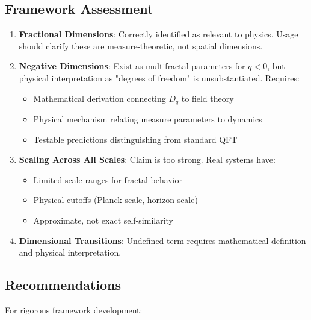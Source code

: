 \subsection{Framework Assessment}

\begin{enumerate}
    \item \textbf{Fractional Dimensions}: Correctly identified as relevant to physics. Usage should clarify these are measure-theoretic, not spatial dimensions.

    \item \textbf{Negative Dimensions}: Exist as multifractal parameters for $q < 0$, but physical interpretation as "degrees of freedom" is unsubstantiated. Requires:
    \begin{itemize}
        \item Mathematical derivation connecting $D_q$ to field theory
        \item Physical mechanism relating measure parameters to dynamics
        \item Testable predictions distinguishing from standard QFT
    \end{itemize}

    \item \textbf{Scaling Across All Scales}: Claim is too strong. Real systems have:
    \begin{itemize}
        \item Limited scale ranges for fractal behavior
        \item Physical cutoffs (Planck scale, horizon scale)
        \item Approximate, not exact self-similarity
    \end{itemize}

    \item \textbf{Dimensional Transitions}: Undefined term requires mathematical definition and physical interpretation.
\end{enumerate}

\subsection{Recommendations}

For rigorous framework development:

